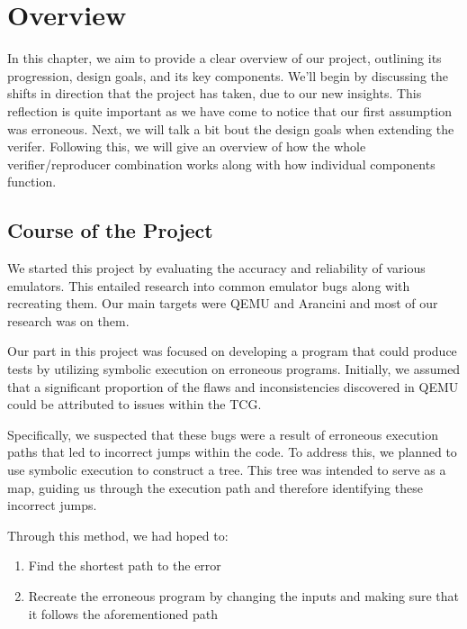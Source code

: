 
\chapter{Overview}\label{chapter:overview}
In this chapter, we aim to provide a clear overview of our project, outlining its progression, design goals, and its key components.
We'll begin by discussing the shifts in direction that the project has taken, due to our new insights.
This reflection is quite important as we have come to notice that our first assumption was erroneous.
Next, we will talk a bit bout the design goals when extending the verifer.
Following this, we will give an overview of how the whole verifier/reproducer combination works along with how individual components function.

\section{Course of the Project}
We started this project by evaluating the accuracy and reliability of various emulators.
This entailed research into common emulator bugs along with recreating them.
Our main targets were \ac{QEMU} and Arancini and most of our research was on them.

Our part in this project was focused on developing a program that could produce tests by utilizing symbolic execution on erroneous programs.
Initially, we assumed that a significant proportion of the flaws and inconsistencies discovered in \ac{QEMU} could be attributed to issues within the \ac{TCG}.

Specifically, we suspected that these bugs were a result of erroneous execution paths that led to incorrect jumps within the code. To address this, we planned to use symbolic execution to construct a tree.
This tree was intended to serve as a map, guiding us through the execution path and therefore identifying these incorrect jumps.

Through this method, we had hoped to:
\begin{enumerate}[label=(\Alph*)]
   \item Find the shortest path to the error
   \item Recreate the erroneous program by changing the inputs and making sure that it follows the aforementioned path
\end{enumerate}

